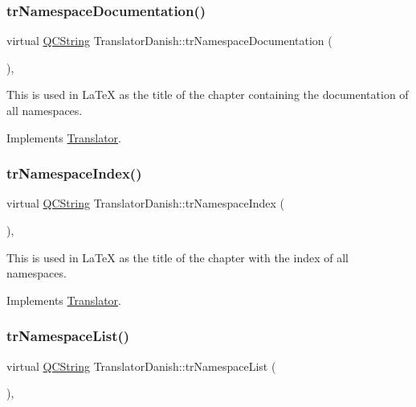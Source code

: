 \subsubsection{\texorpdfstring{trNamespaceDocumentation()}{trNamespaceDocumentation()}}
{\footnotesize\ttfamily virtual \mbox{\hyperlink{class_q_c_string}{Q\+C\+String}} Translator\+Danish\+::tr\+Namespace\+Documentation (\begin{DoxyParamCaption}{ }\end{DoxyParamCaption})\hspace{0.3cm}{\ttfamily [inline]}, {\ttfamily [virtual]}}

This is used in La\+TeX as the title of the chapter containing the documentation of all namespaces. 

Implements \mbox{\hyperlink{class_translator}{Translator}}.

\mbox{\label{class_translator_danish_a3a5f9da039040cc83959b262257d16c5}} 
\subsubsection{\texorpdfstring{trNamespaceIndex()}{trNamespaceIndex()}}
{\footnotesize\ttfamily virtual \mbox{\hyperlink{class_q_c_string}{Q\+C\+String}} Translator\+Danish\+::tr\+Namespace\+Index (\begin{DoxyParamCaption}{ }\end{DoxyParamCaption})\hspace{0.3cm}{\ttfamily [inline]}, {\ttfamily [virtual]}}

This is used in La\+TeX as the title of the chapter with the index of all namespaces. 

Implements \mbox{\hyperlink{class_translator}{Translator}}.

\mbox{\label{class_translator_danish_a23e071c06bf9130c337d49cd9e8c2109}} 
\subsubsection{\texorpdfstring{trNamespaceList()}{trNamespaceList()}}
{\footnotesize\ttfamily virtual \mbox{\hyperlink{class_q_c_string}{Q\+C\+String}} Translator\+Danish\+::tr\+Namespace\+List (\begin{DoxyParamCaption}{ }\end{DoxyParamCaption})\hspace{0.3cm}{\ttfamily [inline]}, {\ttfamily [virtual]}}

